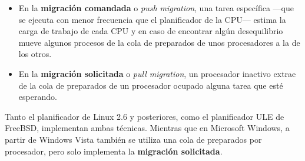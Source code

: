 \begin{itemize}
\item
  En la \textbf{migración comandada}{} o \emph{push migration}, una
  tarea específica ---que se ejecuta con menor frecuencia que el
  planificador de la CPU--- estima la carga de trabajo de cada CPU y en
  caso de encontrar algún desequilibrio mueve algunos procesos de la
  cola de preparados de unos procesadores a la de los otros.
\item
  En la \textbf{migración solicitada}{} o \emph{pull migration}, un
  procesador inactivo extrae de la cola de preparados de un procesador
  ocupado alguna tarea que esté esperando.
\end{itemize}

Tanto el planificador de Linux 2.6 y posteriores, como el planificador
ULE de FreeBSD, implementan ambas técnicas. Mientras que en Microsoft
Windows, a partir de Windows Vista también se utiliza una cola de
preparados por procesador, pero solo implementa la \textbf{migración
solicitada}.
